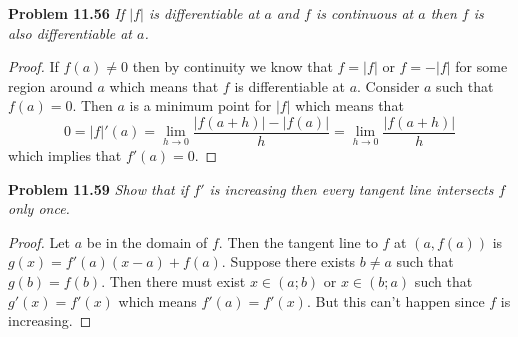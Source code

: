 \documentclass{article}
\begin{document}
\begin{flushleft}
\textbf{Problem 11.56}
\textsl{If $|f|$ is differentiable at $a$ and $f$ is continuous at $a$ then $f$ is also differentiable at $a$.}
\begin{proof}
If $f(a) \neq 0$ then by continuity we know that $f = |f|$ or $f = -|f|$ for some region around $a$ which means that $f$ is differentiable at $a$. Consider $a$ such that $f(a) = 0$. Then $a$ is a minimum point for $|f|$ which means that
\[
0 = |f|'(a) = \lim_{h \rightarrow 0} \frac{|f(a+h)| - |f(a)|}{h} = \lim_{h \rightarrow 0} \frac{|f(a+h)|}{h}
\]
which implies that $f'(a) = 0$.
\end{proof}

\textbf{Problem 11.59}
\textsl{Show that if $f'$ is increasing then every tangent line intersects $f$ only once.}
\begin{proof}
Let $a$ be in the domain of $f$. Then the tangent line to $f$ at $(a,f(a))$ is $g(x) = f'(a)(x-a) + f(a)$. Suppose there exists $b \neq a$ such that $g(b) = f(b)$. Then there must exist $x \in (a;b)$ or $x \in (b;a)$ such that $g'(x) = f'(x)$ which means $f'(a) = f'(x)$. But this can't happen since $f$ is increasing.
\end{proof}

\end{flushleft}
\end{document}
